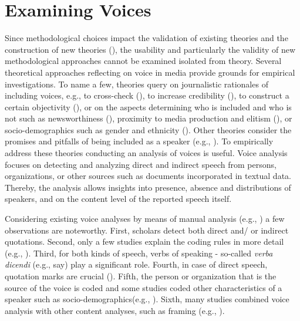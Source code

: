\documentclass{ccr}
\begin{document}
\section{Examining Voices}Since methodological choices impact the validation of existing theories and the construction of new theories (\cite{hepp2016kommunikations, mahrt2015mit, strippel2018zukunft}), the usability and particularly the validity of new methodological approaches cannot be examined isolated from theory. Several theoretical approaches reflecting on voice in media provide grounds for empirical investigations. To name a few, theories query on journalistic rationales of including voices, e.g., to cross-check (\cite{reich2011source}), to increase credibility (\cite{gans1979deciding}), to construct a certain objectivity (\cite{tuch1972}), or on the aspects determining who is included and who is not such as newsworthiness (\cite{reich2011source}), proximity to media production and elitism (\cite{hall1978policing}), or socio-demographics such as gender and ethnicity (\cite{bennett1990toward, benson2009makes, hall1978policing}). Other theories consider the promises and pitfalls of being included as a speaker (e.g., \cite{berkowitz2009reports, manning2001news}).
To empirically address these theories conducting an analysis of voices is useful. Voice analysis focuses on detecting and analyzing direct and indirect speech from persons, organizations, or other sources such as documents incorporated in textual data. Thereby, the analysis allows insights into presence, absence and distributions of speakers, and on the content level of the reported speech itself.

Considering existing voice analyses by means of manual analysis (e.g., \cite{crawley2016victims, fengler2020stumme, thorbjornsrud2016marginalized}) a few observations are noteworthy. First, scholars detect both direct and/ or indirect quotations. Second, only a few studies explain the coding rules in more detail (e.g., \cite{carpenter2008source, thorbjornsrud2016marginalized}). Third, for both kinds of speech, verbs of speaking - so-called \textit{verba dicendi} (e.g., say) play a significant role. Fourth, in case of direct speech, quotation marks are crucial (\cite{thorbjornsrud2016marginalized}). Fifth, the person or organization that is the source of the voice is coded and some studies coded other characteristics of a speaker such as socio-demographics(e.g., \cite{crawley2016victims}). Sixth, many studies combined voice analysis with other content analyses, such as framing (e.g., \cite{brown2017changing, thorbjornsrud2016marginalized}).
\end{document}
